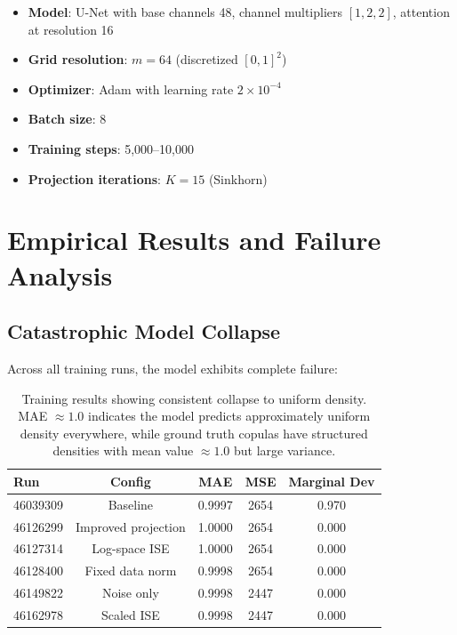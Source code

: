\documentclass[11pt]{article}
\begin{document}
\begin{itemize}
    \item \textbf{Model}: U-Net with base channels 48, channel multipliers $[1, 2, 2]$, attention at resolution 16
    \item \textbf{Grid resolution}: $m = 64$ (discretized $[0,1]^2$)
    \item \textbf{Optimizer}: Adam with learning rate $2 \times 10^{-4}$
    \item \textbf{Batch size}: 8
    \item \textbf{Training steps}: 5,000--10,000
    \item \textbf{Projection iterations}: $K = 15$ (Sinkhorn)
\end{itemize}

\section{Empirical Results and Failure Analysis}

\subsection{Catastrophic Model Collapse}

Across all training runs, the model exhibits complete failure:

\begin{table}[h]
\centering
\begin{tabular}{lcccc}
\hline
\textbf{Run} & \textbf{Config} & \textbf{MAE} & \textbf{MSE} & \textbf{Marginal Dev} \\
\hline
46039309 & Baseline & 0.9997 & 2654 & 0.970 \\
46126299 & Improved projection & 1.0000 & 2654 & 0.000 \\
46127314 & Log-space ISE & 1.0000 & 2654 & 0.000 \\
46128400 & Fixed data norm & 0.9998 & 2654 & 0.000 \\
46149822 & Noise only & 0.9998 & 2447 & 0.000 \\
46162978 & Scaled ISE & 0.9998 & 2447 & 0.000 \\
\hline
\end{tabular}
\caption{Training results showing consistent collapse to uniform density. MAE $\approx 1.0$ indicates the model predicts approximately uniform density everywhere, while ground truth copulas have structured densities with mean value $\approx 1.0$ but large variance.}
\end{table}
\end{document}
